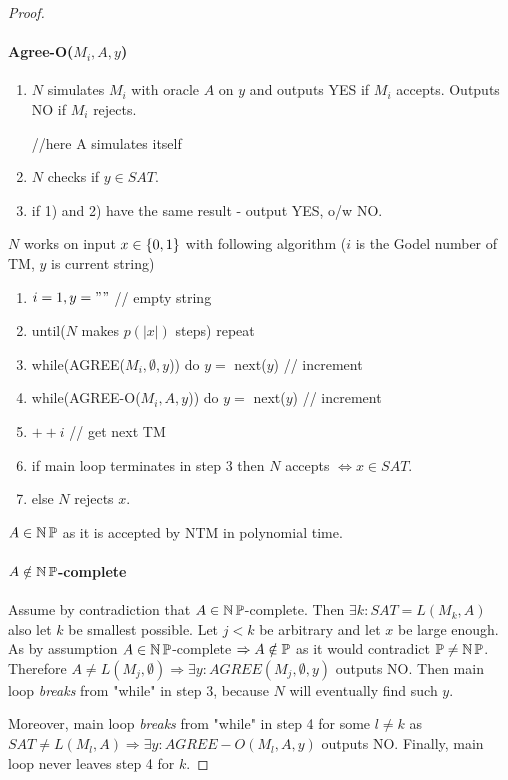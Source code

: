 \begin{proof}
	\paragraph{Agree-O($M_i, A, y$)}
	\begin{enumerate}
		\item $N$ simulates $M_i$ with oracle $A$ on $y$ and outputs YES if $M_i$ accepts.
			Outputs NO if $M_i$ rejects.

		//here A simulates itself
		\item $N$ checks if $y \in SAT$.
		\item if 1) and 2) have the same result - output YES, o/w NO.
	\end{enumerate}
	$N$ works on input $x \in \operatorname{\{ 0, 1 \}}$ with following algorithm ($i$ is the Godel number of TM, $y$ is current string)
	\begin{enumerate}
		\item $i = 1, y = ""$ // empty string
		\item until($N$ makes $p(|x|)$ steps) repeat
		\item \tab while(AGREE($M_i, \emptyset, y$)) do $y = $ next($y$) // increment
		\item \tab while(AGREE-O($M_i, A, y$)) do $y = $ next($y$) // increment
		\item \tab $++i$ // get next TM
		\item if main loop terminates in step 3 then $N$ accepts $\iff x \in SAT$.
		\item else $N$ rejects $x$.
	\end{enumerate}

	$A \in \operatorname{\operatorname{\mathbb{N}}\mathbb{P}}$ as it is accepted by NTM in polynomial time.

	\paragraph{$A \notin \operatorname{\operatorname{\mathbb{N}}\mathbb{P}}$-complete} Assume by contradiction that $A \in \operatorname{\operatorname{\mathbb{N}}\mathbb{P}}$-complete.
	Then $\exists k: SAT = L(M_k, A)$ also let $k$ be smallest possible.
	Let $j < k$ be arbitrary and let $x$ be large enough.
	As by assumption $A \in \operatorname{\operatorname{\mathbb{N}}\mathbb{P}}$-complete $\Rightarrow A \notin \operatorname{\mathbb{P}}$ as it would contradict $\operatorname{\mathbb{P}} \ne \operatorname{\operatorname{\mathbb{N}}\mathbb{P}}$.
	Therefore $A \ne L(M_j, \emptyset) \Rightarrow \exists y: AGREE(M_j, \emptyset, y)$ outputs NO.
	Then main loop \emph{breaks} from "while" in step 3, because $N$ will eventually find such $y$.

	Moreover, main loop \emph{breaks} from "while" in step 4 for some $l \ne k$ as $SAT \ne L(M_l, A) \Rightarrow \exists y: AGREE-O(M_l, A, y)$ outputs NO.
	Finally, main loop never leaves step 4 for $k$.


\end{proof}
